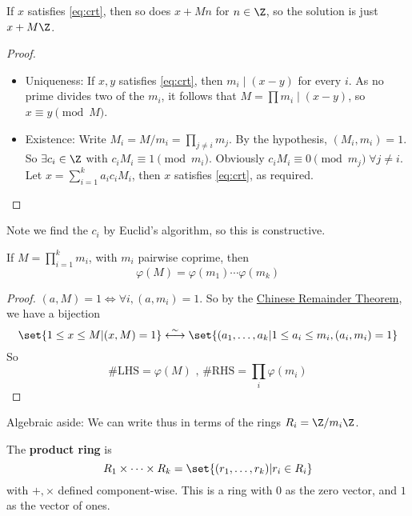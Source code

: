 \documentclass{article}
\begin{document}
\begin{remark}
    If $x$ satisfies \cref{eq:crt}, then so does $x+Mn$ for $n \in \Z$, so the solution is just $x + M\Z$.
\end{remark}

\begin{proof}
    \leavevmode
    \begin{itemize}
        \item Uniqueness: If $x, y$ satisfies  \cref{eq:crt}, then $m_i \mid (x-y)$ for every $i$. As no prime divides two of the $m_i$, it follows that $M= \prod m_i \mid (x-y)$, so $x \equiv y \pmod{M}$.
        \item Existence: Write $M_i = M/m_i = \prod_{j\neq i} m_j$.
            By the hypothesis, $(M_i, m_i) = 1$. So $ \exists c_i \in \Z$ with $c_i M _i \equiv 1 \pmod{m_i}$.
            Obviously $c_i M_i \equiv 0 \pmod{m_j}\; \forall j \neq i$. Let $x = \sum_{i=1}^k a_i c_i M_i$, then $x$ satisfies \cref{eq:crt}, as required.
    \end{itemize}
\end{proof}

Note we find the $c_i$ by Euclid's algorithm, so this is constructive.

\begin{cor}
    If $M = \prod_{i=1}^k m_i$, with $m_i$ pairwise coprime, then
    \begin{equation*}
        \varphi(M) = \varphi(m_1) \dotsm \varphi (m_k)
    \end{equation*}
\end{cor}

\begin{proof}
    $(a, M) = 1 \Leftrightarrow \forall i, (a, m_i)=1$. So by the \hyperlink{thm:crt}{Chinese Remainder Theorem}, we have a bijection
    \begin{equation*}
        \set{ 1 \leq x \leq M | (x, M) = 1} \stackrel{\sim}{\longleftrightarrow} \set{ (a_1, \dotsc, a_k | 1 \leq a_i \leq m_i, (a_i, m_i) = 1 }
    \end{equation*} So
    \[ \#\text{LHS} = \varphi (M) \text{ , } \#\text{RHS} = \prod_i \varphi (m_i) \]
\end{proof}

Algebraic aside: We can write thus in terms of the rings $R_i = \Z / m_i \Z$.

\begin{defi}
    The \textbf{product ring} is
    \begin{equation*}
        R_1 \times \dotsb \times R_k = \set{(r_1, \dotsc, r_k) | r_i \in R_i }
    \end{equation*} with $+, \times$ defined component-wise.
    This is a ring with $0$ as the zero vector, and $1$ as the vector of ones.
\end{defi}
\end{document}

